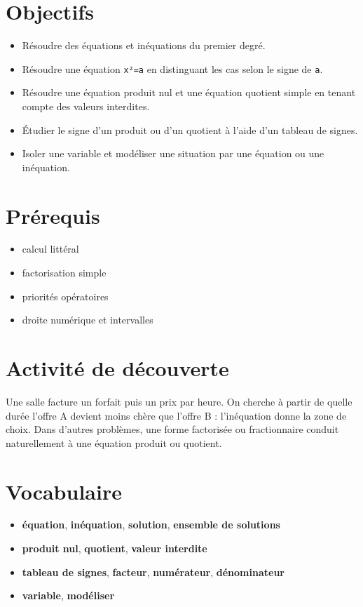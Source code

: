 \section{Objectifs}

\begin{itemize}
\item Résoudre des équations et inéquations du premier degré.
\item Résoudre une équation \texttt{x²=a} en distinguant les cas selon le signe de \texttt{a}.
\item Résoudre une équation produit nul et une équation quotient simple en tenant compte des valeurs interdites.
\item Étudier le signe d'un produit ou d'un quotient à l'aide d'un tableau de signes.
\item Isoler une variable et modéliser une situation par une équation ou une inéquation.
\end{itemize}

\section{Prérequis}

\begin{itemize}
\item calcul littéral
\item factorisation simple
\item priorités opératoires
\item droite numérique et intervalles
\end{itemize}

\section{Activité de découverte}

Une salle facture un forfait puis un prix par heure. On cherche à partir de quelle durée l'offre A devient moins chère que l'offre B : l'inéquation donne la zone de choix. Dans d'autres problèmes, une forme factorisée ou fractionnaire conduit naturellement à une équation produit ou quotient.

\section{Vocabulaire}

\begin{itemize}
\item \textbf{équation}, \textbf{inéquation}, \textbf{solution}, \textbf{ensemble de solutions}
\item \textbf{produit nul}, \textbf{quotient}, \textbf{valeur interdite}
\item \textbf{tableau de signes}, \textbf{facteur}, \textbf{numérateur}, \textbf{dénominateur}
\item \textbf{variable}, \textbf{modéliser}
\end{itemize}

